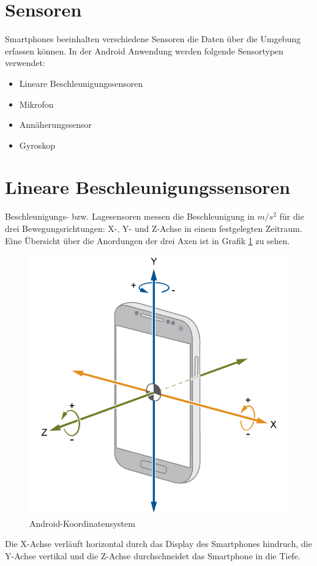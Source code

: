 \documentclass[11pt,a4paper]{report}
\begin{document}
\section{Sensoren}
Smartphones beeinhalten verschiedene Sensoren die Daten über die Umgebung erfassen können.
In der Android Anwendung werden folgende Sensortypen verwendet:
\begin{itemize}
  \item Lineare Beschleunigungssensoren
  \item Mikrofon
  \item Annäherungssensor
  \item Gyroskop
\end{itemize}

\section{Lineare Beschleunigungssensoren}
Beschleunigungs- bzw. Lagesensoren messen die Beschleunigung in $m/s^2$ für die drei Bewegungsrichtungen: X-, Y- und Z-Achse in einem festgelegten Zeitraum.
Eine Übersicht über die Anordungen der drei Axen ist in Grafik \ref{fig:and_axes} zu sehen.
\begin{figure}[htbp]
  \centering
  \includegraphics[width=.8\textwidth]{images/android_axes.png}
  \caption{Android-Koordinatensystem}
  \label{fig:and_axes}
\end{figure}
Die X-Achse verläuft horizontal durch das Display des Smartphones hindruch, die Y-Achse vertikal und die Z-Achse durchschneidet das Smartphone in die Tiefe.
\\\\
\end{document}
